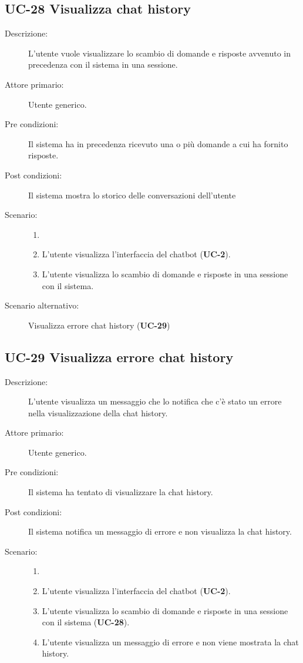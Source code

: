 \subsection{UC-28 Visualizza chat history}
\begin{description}
    \item[Descrizione:] L'utente vuole visualizzare lo scambio di domande e risposte avvenuto in precedenza con il sistema in una sessione.
    \item[Attore primario:] Utente generico.
    \item[Pre condizioni:] Il sistema ha in precedenza ricevuto una o più domande a cui ha fornito risposte.
    \item[Post condizioni:] Il sistema mostra lo storico delle conversazioni dell'utente
    \item[Scenario:]
    \begin{enumerate}
        \item[] 
        \item L’utente visualizza l'interfaccia del chatbot (\textbf{UC-2}).
        \item L'utente visualizza lo scambio di domande e risposte in una sessione con il sistema.
    \end{enumerate}
    
    \item[Scenario alternativo:] Visualizza errore chat history (\textbf{UC-29})
\end{description} 

\subsection{UC-29 Visualizza errore chat history }
\begin{description}
    \item[Descrizione:] L'utente visualizza un messaggio che lo notifica che c'è stato un errore nella visualizzazione della chat history.
    \item[Attore primario:] Utente generico.
    \item[Pre condizioni:] Il sistema ha tentato di visualizzare la chat history.
    \item[Post condizioni:] Il sistema notifica un messaggio di errore e non visualizza la chat history.
    \item[Scenario:] 
    \begin{enumerate}
        \item[] 
        \item L’utente visualizza l'interfaccia del chatbot (\textbf{UC-2}).
        \item L'utente visualizza lo scambio di domande e risposte in una sessione con il sistema (\textbf{UC-28}).
        \item L'utente visualizza un messaggio di errore e non viene mostrata la chat history.
    \end{enumerate}
\end{description}

